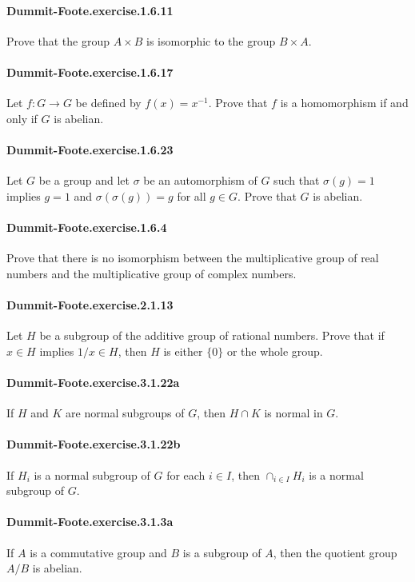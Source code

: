\documentclass{article}
\begin{document}
\paragraph{Dummit-Foote.exercise.1.6.11} Prove that the group $A\times B$ is isomorphic to the group $B\times A$.

\paragraph{Dummit-Foote.exercise.1.6.17} Let $f:G\to G$ be defined by $f(x)=x^{-1}$. Prove that $f$ is a homomorphism if and only if $G$ is abelian.

\paragraph{Dummit-Foote.exercise.1.6.23} Let $G$ be a group and let $\sigma$ be an automorphism of $G$ such that $\sigma(g)=1$ implies $g=1$ and $\sigma(\sigma(g))=g$ for all $g\in G$. Prove that $G$ is abelian.

\paragraph{Dummit-Foote.exercise.1.6.4} Prove that there is no isomorphism between the multiplicative group of real numbers and the multiplicative group of complex numbers.

\paragraph{Dummit-Foote.exercise.2.1.13} Let $H$ be a subgroup of the additive group of rational numbers. Prove that if $x\in H$ implies $1/x\in H$, then $H$ is either $\{0\}$ or the whole group.

\paragraph{Dummit-Foote.exercise.3.1.22a} If $H$ and $K$ are normal subgroups of $G$, then $H\cap K$ is normal in $G$.

\paragraph{Dummit-Foote.exercise.3.1.22b} If $H_i$ is a normal subgroup of $G$ for each $i\in I$, then $\cap_{i\in I} H_i$ is a normal subgroup of $G$.

\paragraph{Dummit-Foote.exercise.3.1.3a} If $A$ is a commutative group and $B$ is a subgroup of $A$, then the quotient group $A/B$ is abelian.
\end{document}
